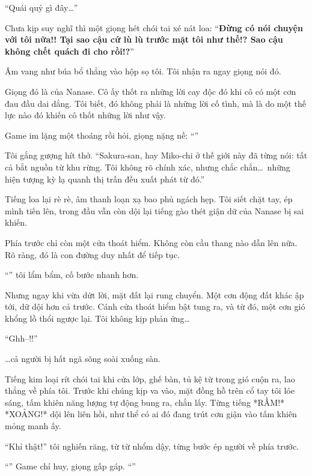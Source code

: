 \documentclass[../main.tex]{subfiles}
\begin{document}
``Quái quỷ gì đây\dots''

Chưa kịp suy nghĩ thì một giọng hét chói tai xé nát loa: ``\textbf{Đừng có nói chuyện với tôi nữa!! Tại sao cậu cứ lù lù trước mặt tôi như thế!? Sao cậu không chết quách đi cho rồi!?}''

Âm vang như búa bổ thẳng vào hộp sọ tôi. Tôi nhận ra ngay giọng nói đó.

Giọng đó là của Nanase. Cô ấy thốt ra những lời cay độc đó khi cô có một cơn đau đầu dai dẳng. Tôi biết, đó không phải là những lời cố tình, mà là do một thế lực nào đó khiến cô thốt những lời như vậy.

Game im lặng một thoáng rồi hỏi, giọng nặng nề: ``''

Tôi gắng gượng hít thở. ``Sakura-san, hay Miko-chi ở thế giới này đã từng nói: tất cả bắt nguồn từ khu rừng. Tôi không rõ chính xác, nhưng chắc chắn\dots\ những hiện tượng kỳ lạ quanh thị trấn đều xuất phát từ đó.''

Tiếng loa lại rè rè, âm thanh loạn xạ bao phủ ngách hẹp. Tôi siết chặt tay, ép mình tiến lên, trong đầu vẫn còn dội lại tiếng gào thét giận dữ của Nanase bị sai khiến.

Phía trước chỉ còn một cửa thoát hiểm. Không còn cầu thang nào dẫn lên nữa. Rõ ràng, đó là con đường duy nhất để tiếp tục.

``'' tôi lẩm bẩm, cố bước nhanh hơn.

Nhưng ngay khi vừa dứt lời, mặt đất lại rung chuyển. Một cơn động đất khác ập tới, dữ dội hơn cả trước. Cánh cửa thoát hiểm bật tung ra, và từ đó, một cơn gió khổng lồ thổi ngược lại. Tôi không kịp phản ứng\dots

``Ghh--!!''

\dots cả người bị hất ngã sõng soài xuống sàn.

Tiếng kim loại rít chói tai khi cửa lớp, ghế bàn, tủ kệ từ trong gió cuộn ra, lao thẳng về phía tôi. Trước khi chúng kịp va vào, mặt đồng hồ trên cổ tay tôi lóe sáng, tấm khiên năng lượng tự động bung ra, chắn lấy. Từng tiếng *RẦM!* *XOẢNG!* dội lên liên hồi, như thể có ai đó đang trút cơn giận vào tấm khiên mỏng manh ấy.

``Khỉ thật!'' tôi nghiến răng, từ từ nhổm dậy, từng bước ép người về phía trước.

``'' Game chỉ huy, giọng gấp gáp. ``''
\end{document}
